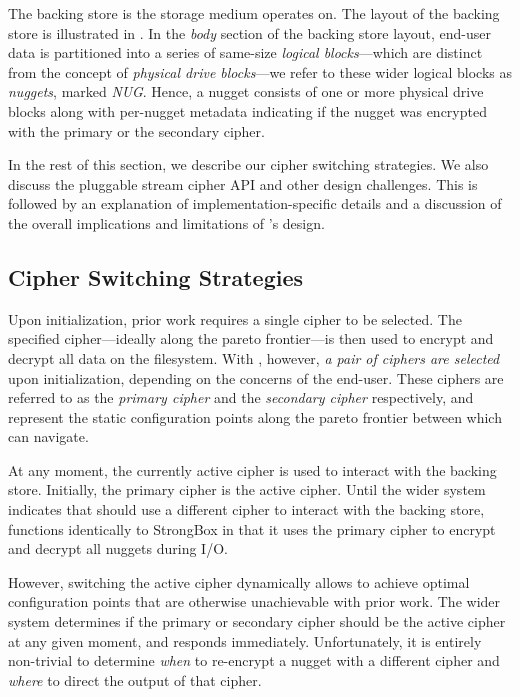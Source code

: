 The backing store is the storage medium \SYSTEM{} operates on. The layout of the
backing store is illustrated in . In the \textit{body} section
of the backing store layout, end-user data is partitioned into a series of
same-size \emph{logical blocks}---which are distinct from the concept of
\emph{physical drive blocks}---we refer to these wider logical blocks as
\emph{nuggets}, marked \textit{NUG}. Hence, a nugget consists of one or more
physical drive blocks along with per-nugget metadata indicating if the nugget
was encrypted with the primary or the secondary cipher. 

In the rest of this section, we describe our cipher switching strategies. We
also discuss the pluggable stream cipher API and other design challenges. This
is followed by an explanation of implementation-specific details and a
discussion of the overall implications and limitations of \SYSTEM{}'s design.

\subsection{Cipher Switching Strategies}

Upon initialization, prior work requires a single cipher to be selected. The
specified cipher---ideally along the pareto frontier---is then used to encrypt
and decrypt all data on the filesystem. With \SYSTEM{}, however, \emph{a pair of
ciphers are selected} upon initialization, depending on the concerns of the
end-user. These ciphers are referred to as the \emph{primary cipher} and the
\emph{secondary cipher} respectively, and represent the static configuration
points along the pareto frontier between which \SYSTEM{} can navigate.

At any moment, the currently active cipher is used to interact with the backing
store. Initially, the primary cipher is the active cipher. Until the wider
system indicates that \SYSTEM{} should use a different cipher to interact with
the backing store, \SYSTEM{} functions identically to StrongBox in that it uses
the primary cipher to encrypt and decrypt all nuggets during I/O.

However, switching the active cipher dynamically allows \SYSTEM{} to achieve
optimal configuration points that are otherwise unachievable with prior work.
The wider system determines if the primary or secondary cipher should be the
active cipher at any given moment, and \SYSTEM{} responds immediately.
Unfortunately, it is entirely non-trivial to determine \emph{when} to re-encrypt
a nugget with a different cipher and \emph{where} to direct the output of that
cipher.


